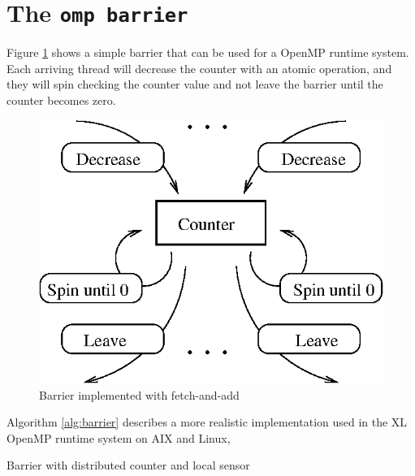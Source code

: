 \section{The \texttt{omp barrier}}

Figure \ref{fig:fetchandadd} shows a simple barrier that can be used
for a OpenMP runtime system. Each arriving thread will decrease the
counter with an atomic operation, and they will spin checking the
counter value and not leave the barrier until the counter becomes zero.

\begin{figure}[htbp]
  \begin{center}
    \includegraphics[angle=0, scale=.75]{fetchandadd.eps}
    \caption{Barrier implemented with fetch-and-add}
    \label{fig:fetchandadd}
  \end{center}
\end{figure}

Algorithm \ref{alg:barrier} describes a more realistic implementation used 
in the XL OpenMP runtime system on AIX and Linux,

\begin{algorithm}[h]
  \SetLine
  \BlankLine
  \caption{Barrier with distributed counter and local sensor}
  \label{alg:barrier}
\end{algorithm}


